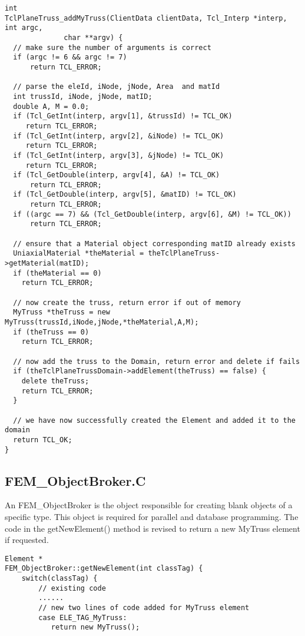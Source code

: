 \documentclass[12pt]{article}
\begin{document}
{\sf \begin{verbatim}
int
TclPlaneTruss_addMyTruss(ClientData clientData, Tcl_Interp *interp, int argc, 
		      char **argv) {
  // make sure the number of arguments is correct
  if (argc != 6 && argc != 7) 
      return TCL_ERROR;

  // parse the eleId, iNode, jNode, Area  and matId
  int trussId, iNode, jNode, matID;
  double A, M = 0.0;
  if (Tcl_GetInt(interp, argv[1], &trussId) != TCL_OK) 
     return TCL_ERROR;
  if (Tcl_GetInt(interp, argv[2], &iNode) != TCL_OK) 
     return TCL_ERROR;
  if (Tcl_GetInt(interp, argv[3], &jNode) != TCL_OK) 
     return TCL_ERROR;
  if (Tcl_GetDouble(interp, argv[4], &A) != TCL_OK) 
      return TCL_ERROR;
  if (Tcl_GetDouble(interp, argv[5], &matID) != TCL_OK) 
      return TCL_ERROR;
  if ((argc == 7) && (Tcl_GetDouble(interp, argv[6], &M) != TCL_OK))
      return TCL_ERROR;
  
  // ensure that a Material object corresponding matID already exists  
  UniaxialMaterial *theMaterial = theTclPlaneTruss->getMaterial(matID);
  if (theMaterial == 0) 
    return TCL_ERROR;

  // now create the truss, return error if out of memory
  MyTruss *theTruss = new MyTruss(trussId,iNode,jNode,*theMaterial,A,M);
  if (theTruss == 0) 
    return TCL_ERROR;

  // now add the truss to the Domain, return error and delete if fails
  if (theTclPlaneTrussDomain->addElement(theTruss) == false) {
    delete theTruss;
    return TCL_ERROR;
  }

  // we have now successfully created the Element and added it to the domain
  return TCL_OK;
}
\end{verbatim} }

\subsection {\sf FEM\_ObjectBroker.C}
An FEM\_ObjectBroker is the object responsible for creating blank
objects of a specific type. This object is required for parallel and
database programming. The code in the {\sf getNewElement()} method
is revised to return a new MyTruss element if requested.

{\sf \begin{verbatim}
Element *
FEM_ObjectBroker::getNewElement(int classTag) {
    switch(classTag) {
        // existing code
        ......
        // new two lines of code added for MyTruss element
        case ELE_TAG_MyTruss:  
           return new MyTruss();
\end{verbatim} } 
\end{document}
